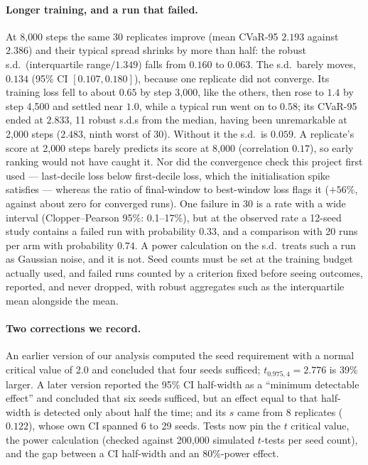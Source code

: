 \documentclass{article}
\newcommand{\cvar}{CVaR-95}
\begin{document}
\paragraph{Longer training, and a run that failed.} At 8{,}000 steps the same 30 replicates improve
(mean \cvar{} $2.193$ against $2.386$) and their typical spread shrinks by more than half: the
robust s.d.\ (interquartile range$/1.349$) falls from $0.160$ to $0.063$. The s.d.\ barely moves,
$0.134$ (95\% CI $[0.107, 0.180]$), because one replicate did not converge. Its training loss fell
to about $0.65$ by step 3{,}000, like the others, then rose to $1.4$ by step 4{,}500 and settled near
$1.0$, while a typical run went on to $0.58$; its \cvar{} ended at $2.833$, 11 robust s.d.s from
the median, having been unremarkable at 2{,}000 steps ($2.483$, ninth worst of 30). Without it the
s.d.\ is $0.059$. A replicate's score at 2{,}000 steps barely predicts its score at 8{,}000
(correlation $0.17$), so early ranking would not have caught it. Nor did the convergence check this
project first used --- last-decile loss below first-decile loss, which the initialisation spike
satisfies --- whereas the ratio of final-window to best-window loss flags it ($+56\%$, against
about zero for converged runs). One failure in 30 is a rate with a wide interval
(Clopper--Pearson 95\%: 0.1--17\%), but at the observed rate a 12-seed study contains a failed run
with probability $0.33$, and a comparison with 20 runs per arm with probability $0.74$. A power
calculation on the s.d.\ treats such a run as Gaussian noise, and it is not. Seed counts must be set
at the training budget actually used, and failed runs counted by a criterion fixed before seeing
outcomes, reported, and never dropped, with robust aggregates such as the interquartile mean
\citep{agarwal2021deep} alongside the mean.

\paragraph{Two corrections we record.} An earlier version of our analysis computed the seed
requirement with a normal critical value of $2.0$ and concluded that four seeds sufficed;
$t_{0.975,4} = 2.776$ is 39\% larger. A later version reported the 95\% CI half-width as a
``minimum detectable effect'' and concluded that six seeds sufficed, but an effect equal to that
half-width is detected only about half the time; and its $s$ came from 8 replicates ($0.122$),
whose own CI spanned 6 to 29 seeds. Tests now pin the $t$ critical value, the power calculation
(checked against 200{,}000 simulated $t$-tests per seed count), and the gap between a CI
half-width and an 80\%-power effect.
\end{document}

